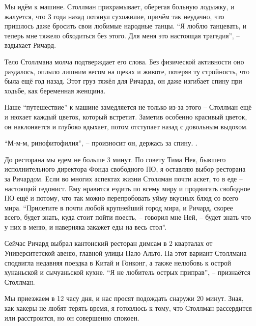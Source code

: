 Мы идём к машине. Столлман прихрамывает, оберегая больную лодыжку, и жалуется, что 3 года назад потянул сухожилие, причём так неудачно, что пришлось даже бросить свои любимые народные танцы. \enquote{Я люблю танцевать, и теперь мне тяжело обходиться без этого. Для меня это настоящая трагедия}, -- вздыхает Ричард.

Тело Столлмана молча подтверждает его слова. Без физической активности оно раздалось, оплыло лишним весом на щеках и животе, потеряв ту стройность, что была ещё год назад. Этот груз тяжёл для Ричарда, он даже изгибает спину при ходьбе, как беременная женщина.

Наше \enquote{путешествие} к машине замедляется не только из-за этого -- Столлман ещё и нюхает каждый цветок, который встретит. Заметив особенно красивый цветок, он наклоняется и глубоко вдыхает, потом отступает назад с довольным выдохом.

\enquote{М-м-м, ринофитофилия}, -- произносит он, держась за спину. .

До ресторана мы едем не больше 3 минут. По совету Тима Нея, бывшего исполнительного директора Фонда свободного ПО, я оставляю выбор ресторана за Ричардом. Если во многих аспектах жизни Столлман почти аскет, то в еде -- настоящий гедонист. Ему нравится ездить по всему миру и продвигать свободное ПО ещё и потому, что так можно перепробовать уйму вкусных блюд со всего мира. \enquote{Прилетите в почти любой крупнейший город мира, и Ричард, скорее всего, будет знать, куда стоит пойти поесть, -- говорил мне Ней, -- будет знать что у них в меню, и наверняка закажет еды на весь стол}.

Сейчас Ричард выбрал кантонский ресторан димсам в 2 кварталах от Университетской авеню, главной улицы Пало-Альто. На этот вариант Столлмана сподвигла недавняя поездка в Китай и Гонконг, а также нелюбовь к острой хунаньской и сычуаньской кухне. \enquote{Я не любитель острых приправ}, -- признаётся Столлман.

Мы приезжаем в 12 часу дня, и нас просят подождать снаружи 20 минут. Зная, как хакеры не любят терять время, я готовлюсь к тому, что Столлман рассердится или расстроится, но он совершенно спокоен.


